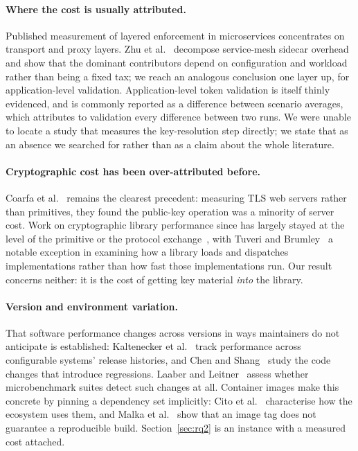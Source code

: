 \documentclass[pdflatex,sn-basic,twocolumn]{sn-jnl}%
\begin{document}
\paragraph{Where the cost is usually attributed.} Published measurement of
layered enforcement in microservices concentrates on transport and proxy
layers. Zhu et al.~\cite{zhu2023dissecting} decompose service-mesh sidecar
overhead and show that the dominant contributors depend on configuration and
workload rather than being a fixed tax; we reach an analogous conclusion one
layer up, for application-level validation. Application-level token validation
is itself thinly evidenced, and is commonly reported as a difference between
scenario averages, which attributes to validation every difference between two
runs. We were unable to locate a study that measures the key-resolution step
directly;
we state that as an absence we searched for rather than as a claim about the
whole literature.

\paragraph{Cryptographic cost has been over-attributed before.} Coarfa et
al.~\cite{coarfa2006performance} remains the clearest precedent: measuring TLS
web servers rather than primitives, they found the public-key operation was a
minority of server cost. Work on cryptographic library performance since has
largely stayed at the level of the primitive or the protocol
exchange~\cite{naser2020performance,sikeridis2020assessing}, with Tuveri and
Brumley~\cite{tuveri2019engines} a notable exception in examining how a library
loads and dispatches implementations rather than how fast those
implementations run. Our result concerns neither: it is the cost of getting key
material \emph{into} the library.

\paragraph{Version and environment variation.} That software performance
changes across versions in ways maintainers do not anticipate is established:
Kaltenecker et al.~\cite{kaltenecker2023performance} track performance across
configurable systems' release histories, and Chen and
Shang~\cite{chen2017exploratory} study the code changes that introduce
regressions. Laaber and Leitner~\cite{laaber2018evaluation} assess whether
microbenchmark suites detect such changes at all. Container images make this
concrete by pinning a dependency set implicitly: Cito et
al.~\cite{cito2017empirical} characterise how the ecosystem uses them, and
Malka et al.~\cite{malka2026docker} show that an image tag does not guarantee a
reproducible build. Section~\ref{sec:rq2} is an instance with a measured cost
attached.
\end{document}
